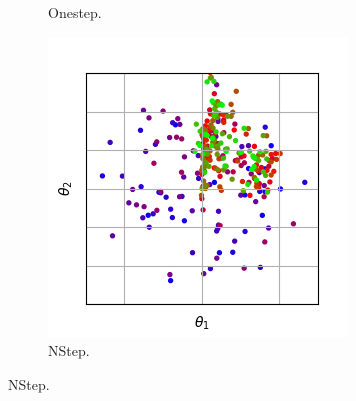 \documentclass{llncs}
\begin{document}
\begin{figure}[t]
\begin{subfigure}[t]{0.24\textwidth}
        \caption{Onestep.}
        \label{subfig:mutation_onestep_01}
    \end{subfigure}
    \begin{subfigure}[t]{0.24\textwidth}
        \centering
        \captionsetup{width=.9\textwidth}
        \includegraphics[width=\textwidth]{figures/mutation/simple_normal-100-10_none_nstep_0-1.png}
        \caption{NStep.}
        \label{subfig:mutation_nstep_01}
    \end{subfigure}
    

\end{figure}
\end{document}
